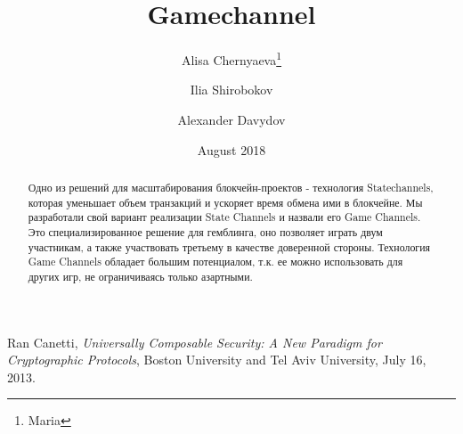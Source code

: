 \documentclass[tikz, 12pt]{article}
\title {Gamechannel}
\author {Alisa Chernyaeva\thanks{Maria}}
\author{Ilia Shirobokov\samethanks}
\author{  Alexander Davydov\samethanks}
\affil{Research department, DAO.Casino Company}
\affil{ \href{mailto:Research@Dao.casino}{Research@Dao.casino}}
\date {August 2018}
\theoremstyle{definition}
\theoremstyle{remark}
\begin{document}
\maketitle
	\begin{abstract}
Одно из решений для масштабирования блокчейн-проектов - технология Statechannels, которая уменьшает объем транзакций и ускоряет время обмена ими в блокчейне.
Мы разработали свой вариант реализации State Channels и назвали его Game Channels. Это специализированное решение для гемблинга, оно позволяет играть двум участникам, а также участвовать третьему в качестве доверенной стороны. 
Технология Game Channels обладает большим потенциалом, т.к. ее можно использовать для других игр, не ограничиваясь только азартными.
	\end{abstract}
\tableofcontents	
	
	
		


	\begin{thebibliography}{9}
Ran Canetti, \emph{Universally Composable Security: A New Paradigm for Cryptographic Protocols}, Boston University and Tel Aviv University, July 16, 2013.
\end{thebibliography}


		
\end{document}
